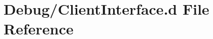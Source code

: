 \hypertarget{Debug_2ClientInterface_8d}{}\section{Debug/\+Client\+Interface.d File Reference}
\label{Debug_2ClientInterface_8d}

